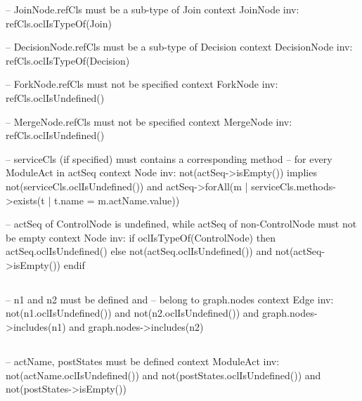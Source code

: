 \begin{lstrule}
-- JoinNode.refCls must be a sub-type of Join
context JoinNode inv:
  refCls.oclIsTypeOf(Join)

-- DecisionNode.refCls must be a sub-type of Decision
context DecisionNode inv:
  refCls.oclIsTypeOf(Decision)

-- ForkNode.refCls must not be specified
context ForkNode inv:
  refCls.oclIsUndefined()

-- MergeNode.refCls must not be specified
context MergeNode inv:
  refCls.oclIsUndefined()
\end{lstrule}

\begin{lstrule}
-- serviceCls (if specified) must contains a corresponding method 
-- for every ModuleAct in actSeq
context Node inv:
  not(actSeq->isEmpty()) implies not(serviceCls.oclIsUndefined()) and 
    actSeq->forAll(m | serviceCls.methods->exists(t | t.name = m.actName.value))
\end{lstrule}

\begin{lstrule}
-- actSeq of ControlNode is undefined, while actSeq of non-ControlNode must not be empty
context Node inv:
  if oclIsTypeOf(ControlNode) 
  then
    actSeq.oclIsUndefined()  
  else
    not(actSeq.oclIsUndefined()) and not(actSeq->isEmpty())
  endif
\end{lstrule}

%
\subsection{}
\begin{lstrule}
-- n1 and n2 must be defined and 
-- belong to graph.nodes
context Edge inv:
  not(n1.oclIsUndefined()) and 
  not(n2.oclIsUndefined()) and 
  graph.nodes->includes(n1) and 
  graph.nodes->includes(n2)
\end{lstrule}

%
\subsection{}
\begin{lstrule}
-- actName, postStates must be defined
context ModuleAct inv:
  not(actName.oclIsUndefined()) and 
  not(postStates.oclIsUndefined()) and not(postStates->isEmpty())
\end{lstrule}

